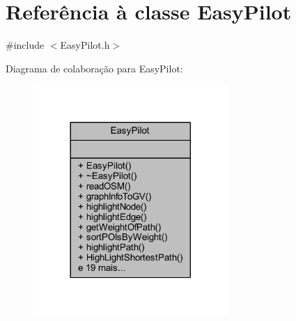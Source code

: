 \hypertarget{class_easy_pilot}{}\section{Referência à classe Easy\+Pilot}
\label{class_easy_pilot}


{\ttfamily \#include $<$Easy\+Pilot.\+h$>$}



Diagrama de colaboração para Easy\+Pilot\+:
\nopagebreak
\begin{figure}[H]
\begin{center}
\leavevmode
\includegraphics[width=209pt]{class_easy_pilot__coll__graph}
\end{center}
\end{figure}
